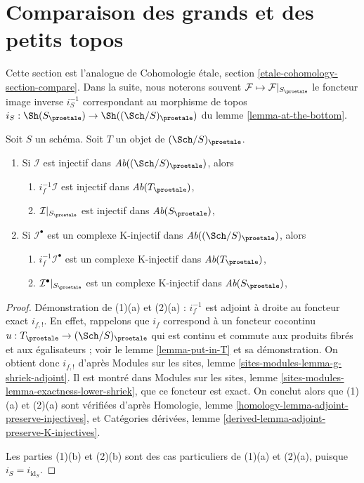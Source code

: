 \section{Comparaison des grands et des petits topos}
\label{section-compare}

\noindent
Cette section est l'analogue de Cohomologie \'etale, section
\ref{etale-cohomology-section-compare}. Dans la suite, nous
noterons souvent $\mathcal{F} \mapsto \mathcal{F}|_{S_\proetale}$
le foncteur image inverse $i_S^{-1}$ correspondant au
morphisme de topos $i_S : \Sh(S_\proetale) \to \Sh((\Sch/S)_\proetale)$
du lemme \ref{lemma-at-the-bottom}.

\begin{lemma}
\label{lemma-compare-injectives}
Soit $S$ un schéma. Soit $T$ un objet de $(\Sch/S)_\proetale$.
\begin{enumerate}
\item Si $\mathcal{I}$ est injectif dans $\textit{Ab}((\Sch/S)_\proetale)$, alors
\begin{enumerate}
\item $i_f^{-1}\mathcal{I}$ est injectif dans $\textit{Ab}(T_\proetale)$,
\item $\mathcal{I}|_{S_\proetale}$ est injectif dans $\textit{Ab}(S_\proetale)$,
\end{enumerate}
\item Si $\mathcal{I}^\bullet$ est un complexe K-injectif
dans $\textit{Ab}((\Sch/S)_\proetale)$, alors
\begin{enumerate}
\item $i_f^{-1}\mathcal{I}^\bullet$ est un complexe K-injectif dans
$\textit{Ab}(T_\proetale)$,
\item $\mathcal{I}^\bullet|_{S_\proetale}$ est un complexe K-injectif dans
$\textit{Ab}(S_\proetale)$,
\end{enumerate}
\end{enumerate}
\end{lemma}

\begin{proof}
Démonstration de (1)(a) et (2)(a) : $i_f^{-1}$ est adjoint à droite
au foncteur exact $i_{f, !}$. En effet, rappelons que $i_f$ correspond
à un foncteur cocontinu $u : T_\proetale \to (\Sch/S)_\proetale$
qui est continu et commute aux produits fibrés et aux égalisateurs ; voir le
lemme \ref{lemma-put-in-T} et sa démonstration. On obtient donc $i_{f, !}$ d'après
Modules sur les sites, lemme \ref{sites-modules-lemma-g-shriek-adjoint}.
Il est montré dans Modules sur les sites, lemme
\ref{sites-modules-lemma-exactness-lower-shriek}, que ce foncteur est exact.
On conclut alors que (1)(a) et (2)(a) sont vérifiées d'après
Homologie, lemme \ref{homology-lemma-adjoint-preserve-injectives}, et
Catégories dérivées, lemme \ref{derived-lemma-adjoint-preserve-K-injectives}.

\medskip\noindent
Les parties (1)(b) et (2)(b) sont des cas particuliers de (1)(a) et (2)(a),
puisque $i_S = i_{\text{id}_S}$.
\end{proof}

